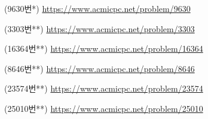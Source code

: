 \begin{problem}
    (9630번*) \url{https://www.acmicpc.net/problem/9630}
\end{problem}
\begin{problem}
    (3303번**) \url{https://www.acmicpc.net/problem/3303}
\end{problem}
\begin{problem}
    (16364번**) \url{https://www.acmicpc.net/problem/16364}
\end{problem}
\begin{problem}
    (8646번**) \url{https://www.acmicpc.net/problem/8646}
\end{problem}
\begin{problem}
    (23574번**) \url{https://www.acmicpc.net/problem/23574}
\end{problem}
\begin{problem}
    (25010번**) \url{https://www.acmicpc.net/problem/25010}
\end{problem}